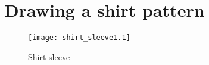 \documentclass{article}
\begin{document}
\section*{Drawing a shirt pattern}

\begin{figure}[htb]
\begin{center}
\texttt{[image: shirt\_sleeve1.1]}
\caption{Shirt sleeve}
\end{center}
\end{figure}
\end{document}
